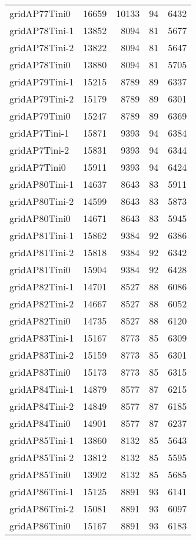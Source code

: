 \begin{longtable}{lrrrr}
gridAP77Tini0 & 16659 & 10133 & 94 & 6432 \\
gridAP78Tini-1 & 13852 & 8094 & 81 & 5677 \\
gridAP78Tini-2 & 13822 & 8094 & 81 & 5647 \\
gridAP78Tini0 & 13880 & 8094 & 81 & 5705 \\
gridAP79Tini-1 & 15215 & 8789 & 89 & 6337 \\
gridAP79Tini-2 & 15179 & 8789 & 89 & 6301 \\
gridAP79Tini0 & 15247 & 8789 & 89 & 6369 \\
gridAP7Tini-1 & 15871 & 9393 & 94 & 6384 \\
gridAP7Tini-2 & 15831 & 9393 & 94 & 6344 \\
gridAP7Tini0 & 15911 & 9393 & 94 & 6424 \\
gridAP80Tini-1 & 14637 & 8643 & 83 & 5911 \\
gridAP80Tini-2 & 14599 & 8643 & 83 & 5873 \\
gridAP80Tini0 & 14671 & 8643 & 83 & 5945 \\
gridAP81Tini-1 & 15862 & 9384 & 92 & 6386 \\
gridAP81Tini-2 & 15818 & 9384 & 92 & 6342 \\
gridAP81Tini0 & 15904 & 9384 & 92 & 6428 \\
gridAP82Tini-1 & 14701 & 8527 & 88 & 6086 \\
gridAP82Tini-2 & 14667 & 8527 & 88 & 6052 \\
gridAP82Tini0 & 14735 & 8527 & 88 & 6120 \\
gridAP83Tini-1 & 15167 & 8773 & 85 & 6309 \\
gridAP83Tini-2 & 15159 & 8773 & 85 & 6301 \\
gridAP83Tini0 & 15173 & 8773 & 85 & 6315 \\
gridAP84Tini-1 & 14879 & 8577 & 87 & 6215 \\
gridAP84Tini-2 & 14849 & 8577 & 87 & 6185 \\
gridAP84Tini0 & 14901 & 8577 & 87 & 6237 \\
gridAP85Tini-1 & 13860 & 8132 & 85 & 5643 \\
gridAP85Tini-2 & 13812 & 8132 & 85 & 5595 \\
gridAP85Tini0 & 13902 & 8132 & 85 & 5685 \\
gridAP86Tini-1 & 15125 & 8891 & 93 & 6141 \\
gridAP86Tini-2 & 15081 & 8891 & 93 & 6097 \\
gridAP86Tini0 & 15167 & 8891 & 93 & 6183 \\

\end{longtable}
